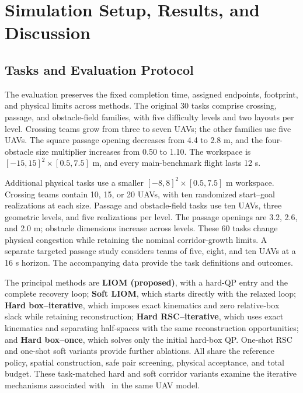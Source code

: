 \section{Simulation Setup, Results, and Discussion}
\label{sec:experiments}
\subsection{Tasks and Evaluation Protocol}
The evaluation preserves the fixed completion time, assigned endpoints, footprint, and physical limits across methods. The original 30 tasks comprise crossing, passage, and obstacle-field families, with five difficulty levels and two layouts per level. Crossing teams grow from three to seven UAVs; the other families use five UAVs. The square passage opening decreases from 4.4 to 2.8 m, and the four-obstacle size multiplier increases from 0.50 to 1.10. The workspace is $[-15,15]^2\times[0.5,7.5]$ m, and every main-benchmark flight lasts 12 s.

Additional physical tasks use a smaller $[-8,8]^2\times[0.5,7.5]$ m workspace. Crossing teams contain 10, 15, or 20 UAVs, with ten randomized start--goal realizations at each size. Passage and obstacle-field tasks use ten UAVs, three geometric levels, and five realizations per level. The passage openings are 3.2, 2.6, and 2.0 m; obstacle dimensions increase across levels. These 60 tasks change physical congestion while retaining the nominal corridor-growth limits. A separate targeted passage study considers teams of five, eight, and ten UAVs at a 16 s horizon. The accompanying data provide the task definitions and outcomes.

The principal methods are \textbf{LIOM (proposed)}, with a hard-QP entry and the complete recovery loop; \textbf{Soft LIOM}, which starts directly with the relaxed loop; \textbf{Hard box--iterative}, which imposes exact kinematics and zero relative-box slack while retaining reconstruction; \textbf{Hard RSC--iterative}, which uses exact kinematics and separating half-spaces with the same reconstruction opportunities; and \textbf{Hard box--once}, which solves only the initial hard-box QP. One-shot RSC and one-shot soft variants provide further ablations. All share the reference policy, spatial construction, safe pair screening, physical acceptance, and total budget. These task-matched hard and soft corridor variants examine the iterative mechanisms associated with~\cite{bu2025,li2022liom,park2021} in the same UAV model.

